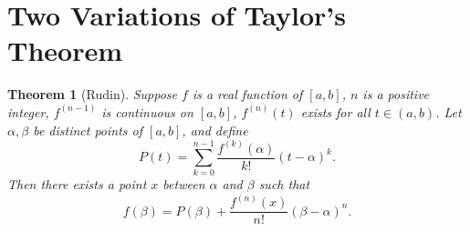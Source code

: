\documentclass[12pt]{article}
\newtheorem{theorem}{Theorem}
\theoremstyle{definition}
\theoremstyle{definition}
\begin{document}
\section{Two Variations of Taylor's Theorem}
    \begin{theorem}[Rudin]
        Suppose $f$ is a real function of $[a, b]$, $n$ is a positive integer,
        $f^{(n-1)}$ is continuous on $[a, b]$, $f^{(n)}(t)$ exists for all
        $t\in(a, b)$. Let $\alpha, \beta$ be distinct points of $[a, b]$, and
        define
        \begin{equation}
            P(t)=\sum_{k=0}^{n-1}\frac{f^{(k)}(\alpha)}{k!}(t-\alpha)^k.
        \end{equation}
        Then there exists a point $x$ between $\alpha$ and $\beta$ such that 
        \begin{equation}
            f(\beta)=P(\beta)+\frac{f^{(n)}(x)}{n!}(\beta-\alpha)^n.
        \end{equation}
    \end{theorem}
\end{document}
